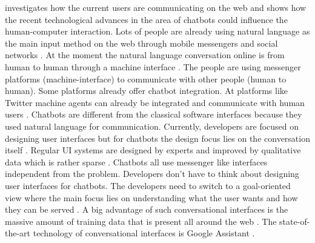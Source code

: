 
\citet{folstad2017chatbots} investigates how the current users are communicating on the web and shows how 
the recent technological advances in the area of chatbots could influence the human-computer interaction.
Lots of people are already using natural language as the main input method on the web through mobile messengers 
and social networks \cite{folstad2017chatbots}. 
At the moment the natural language conversation online is from human to human through a machine interface \cite{folstad2017chatbots}.
The people are using messenger platforms (machine-interface) to communicate with other people (human to human).
Some platforms already offer chatbot integration. 
At platforms like Twitter machine agents can already be integrated and communicate with human users \cite{folstad2017chatbots}. 
Chatbots are different from the classical software interfaces because they used natural language 
for communication.
Currently, developers are focused on designing user interfaces but for chatbots the design focus 
lies on the conversation itself \cite{folstad2017chatbots}. 
Regular UI systems are designed by experts and improved by qualitative data which is rather sparse \cite{folstad2017chatbots}.
Chatbots all use messenger like interfaces independent from the problem.
Developers don't have to think about designing user interfaces for chatbots.
The developers need to switch to a goal-oriented view where the main focus 
lies on understanding what the user wants and how they can be served \cite{folstad2017chatbots}.
A big advantage of such conversational interfaces is the massive amount of training data that is present all around the web \cite{folstad2017chatbots}. 
The state-of-the-art technology of conversational interfaces is Google Assistant \cite{folstad2017chatbots}.

